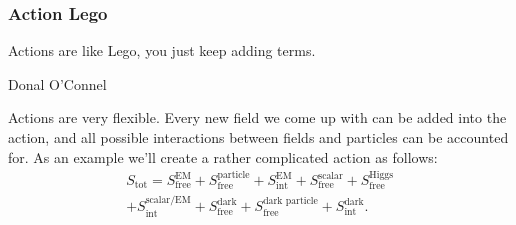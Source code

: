 \documentclass[fleqn]{NotesClass}
\begin{document}
    \subsubsection{Action Lego}
    \epigraph{Actions are like Lego, you just keep adding terms.}{Donal O'Connel}
    Actions are very flexible.
    Every new field we come up with can be added into the action, and all possible interactions between fields and particles can be accounted for.
    As an example we'll create a rather complicated action as follows:
    \begin{multline}
        S_{\text{tot}} = S_{\text{free}}^{\text{EM}} + S_{\text{free}}^{\text{particle}} + S_{\text{int}}^{\text{EM}} + S_{\text{free}}^{\text{scalar}} + S_{\text{free}}^{\text{Higgs}}\\
        + S_{\text{int}}^{\text{scalar/EM}} + S_{\text{free}}^{\text{dark}} + S_{\text{free}}^{\text{dark particle}} + S_{\text{int}}^{\text{dark}}.
    \end{multline}
    
\end{document}
